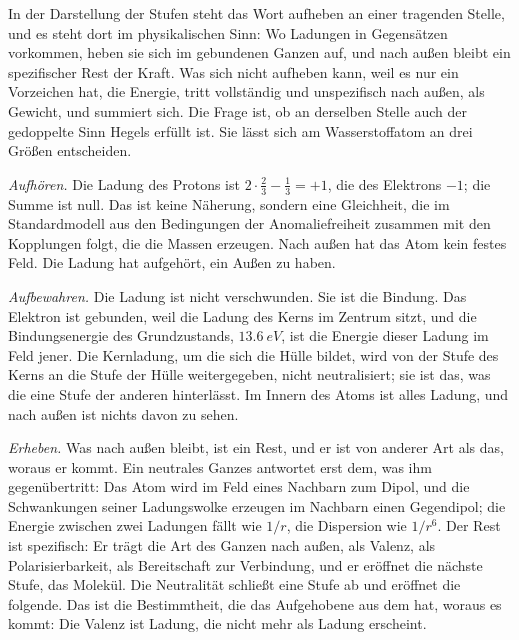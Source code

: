 \documentclass[11pt,a4paper]{article}
\begin{document}
In der Darstellung der Stufen steht das Wort aufheben an einer tragenden Stelle, und es steht dort im physikalischen Sinn: Wo Ladungen in Gegensätzen vorkommen, heben sie sich im gebundenen Ganzen auf, und nach außen bleibt ein spezifischer Rest der Kraft. Was sich nicht aufheben kann, weil es nur ein Vorzeichen hat, die Energie, tritt vollständig und unspezifisch nach außen, als Gewicht, und summiert sich. Die Frage ist, ob an derselben Stelle auch der gedoppelte Sinn Hegels erfüllt ist. Sie lässt sich am Wasserstoffatom an drei Größen entscheiden.

\emph{Aufhören.} Die Ladung des Protons ist $2\cdot\tfrac23-\tfrac13=+1$, die des Elektrons $-1$; die Summe ist null. Das ist keine Näherung, sondern eine Gleichheit, die im Standardmodell aus den Bedingungen der Anomaliefreiheit zusammen mit den Kopplungen folgt, die die Massen erzeugen. Nach außen hat das Atom kein festes Feld. Die Ladung hat aufgehört, ein Außen zu haben.

\emph{Aufbewahren.} Die Ladung ist nicht verschwunden. Sie ist die Bindung. Das Elektron ist gebunden, weil die Ladung des Kerns im Zentrum sitzt, und die Bindungsenergie des Grundzustands, $\SI{13.6}{eV}$, ist die Energie dieser Ladung im Feld jener. Die Kernladung, um die sich die Hülle bildet, wird von der Stufe des Kerns an die Stufe der Hülle weitergegeben, nicht neutralisiert; sie ist das, was die eine Stufe der anderen hinterlässt. Im Innern des Atoms ist alles Ladung, und nach außen ist nichts davon zu sehen.

\emph{Erheben.} Was nach außen bleibt, ist ein Rest, und er ist von anderer Art als das, woraus er kommt. Ein neutrales Ganzes antwortet erst dem, was ihm gegenübertritt: Das Atom wird im Feld eines Nachbarn zum Dipol, und die Schwankungen seiner Ladungswolke erzeugen im Nachbarn einen Gegendipol; die Energie zwischen zwei Ladungen fällt wie $1/r$, die Dispersion wie $1/r^6$. Der Rest ist spezifisch: Er trägt die Art des Ganzen nach außen, als Valenz, als Polarisierbarkeit, als Bereitschaft zur Verbindung, und er eröffnet die nächste Stufe, das Molekül. Die Neutralität schließt eine Stufe ab und eröffnet die folgende. Das ist die Bestimmtheit, die das Aufgehobene aus dem hat, woraus es kommt: Die Valenz ist Ladung, die nicht mehr als Ladung erscheint.
\end{document}
